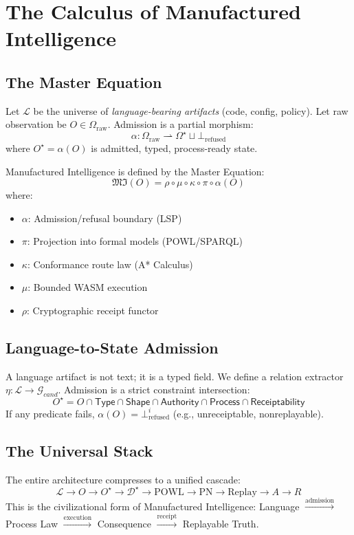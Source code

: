 
\chapter{The Calculus of Manufactured Intelligence}
\section{The Master Equation}
Let $\mathcal{L}$ be the universe of \textit{language-bearing artifacts} (code, config, policy). Let raw observation be $O \in \Omega_{\mathrm{raw}}$. Admission is a partial morphism:
\begin{equation}
\alpha: \Omega_{\mathrm{raw}} \rightharpoonup \Omega^{\star} \sqcup \bot_{\mathrm{refused}}
\end{equation}
where $O^{\star} = \alpha(O)$ is admitted, typed, process-ready state.

Manufactured Intelligence is defined by the Master Equation:
\begin{equation}
\boxed{\mathfrak{MI}(O) = \rho \circ \mu \circ \kappa \circ \pi \circ \alpha(O)}
\end{equation}
where:
\begin{itemize}
    \item $\alpha$: Admission/refusal boundary (LSP)
    \item $\pi$: Projection into formal models (POWL/SPARQL)
    \item $\kappa$: Conformance route law (A* Calculus)
    \item $\mu$: Bounded WASM execution
    \item $\rho$: Cryptographic receipt functor
\end{itemize}

\section{Language-to-State Admission}
A language artifact is not text; it is a typed field. We define a relation extractor $\eta: \mathcal{L} \to \mathcal{G}_{cand}$. Admission is a strict constraint intersection:
\begin{equation}
O^{\star} = O \cap \mathsf{Type} \cap \mathsf{Shape} \cap \mathsf{Authority} \cap \mathsf{Process} \cap \mathsf{Receiptability}
\end{equation}
If any predicate fails, $\alpha(O) = \bot_{\mathrm{refused}}^i$ (e.g., unreceiptable, nonreplayable).

\section{The Universal Stack}
The entire architecture compresses to a unified cascade:
\begin{equation}
\boxed{\mathcal{L} \to O \to O^{\star} \to \mathcal{D}^{\star} \to \text{POWL} \to \text{PN} \to \text{Replay} \to A \to R}
\end{equation}
This is the civilizational form of Manufactured Intelligence: Language $\xrightarrow{\text{admission}}$ Process Law $\xrightarrow{\text{execution}}$ Consequence $\xrightarrow{\text{receipt}}$ Replayable Truth.

